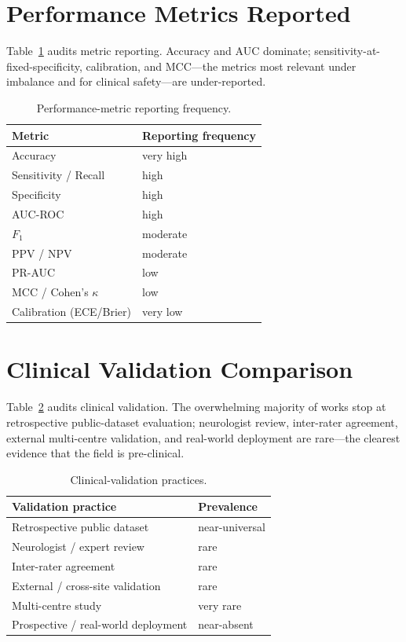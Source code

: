 \section{Performance Metrics Reported}
Table~\ref{tab:metcmp} audits metric reporting. Accuracy and AUC dominate; sensitivity-at-fixed-specificity, calibration, and MCC---the metrics most relevant under imbalance and for clinical safety---are under-reported.
\begin{table}[t]\centering\caption{Performance-metric reporting frequency.}\label{tab:metcmp}
\footnotesize\begin{tabular}{ll}\toprule
Metric & Reporting frequency\\\midrule
Accuracy & very high\\
Sensitivity / Recall & high\\
Specificity & high\\
AUC-ROC & high\\
$F_1$ & moderate\\
PPV / NPV & moderate\\
PR-AUC & low\\
MCC / Cohen's $\kappa$ & low\\
Calibration (ECE/Brier) & very low\\\bottomrule
\end{tabular}\end{table}

\section{Clinical Validation Comparison}
Table~\ref{tab:clin} audits clinical validation. The overwhelming majority of works stop at retrospective public-dataset evaluation; neurologist review, inter-rater agreement, external multi-centre validation, and real-world deployment are rare---the clearest evidence that the field is pre-clinical.
\begin{table}[t]\centering\caption{Clinical-validation practices.}\label{tab:clin}
\footnotesize\begin{tabular}{ll}\toprule
Validation practice & Prevalence\\\midrule
Retrospective public dataset & near-universal\\
Neurologist / expert review & rare\\
Inter-rater agreement & rare\\
External / cross-site validation & rare\\
Multi-centre study & very rare\\
Prospective / real-world deployment & near-absent\\\bottomrule
\end{tabular}\end{table}

